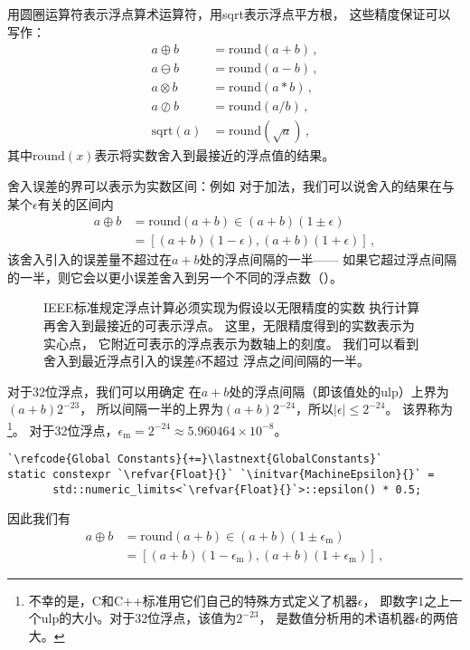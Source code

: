 用圆圈运算符表示浮点算术运算符，用sqrt表示浮点平方根，
这些精度保证可以写作：
\begin{align}
    a\oplus b        & =\mathrm{round}(a+b)\, ,\nonumber      \\
    a\ominus b       & =\mathrm{round}(a-b)\, ,\nonumber      \\
    a\otimes b       & =\mathrm{round}(a*b)\, ,\label{eq:3.7} \\
    a\oslash b       & =\mathrm{round}(a/b)\, ,\nonumber      \\
    \mathrm{sqrt}(a) & =\mathrm{round}(\sqrt{a})\, ,\nonumber
\end{align}
其中$\mathrm{round}(x)$表示将实数舍入到最接近的浮点值的结果。

舍入误差的界可以表示为实数区间：例如
对于加法，我们可以说舍入的结果在与某个$\epsilon$有关的区间内
\begin{align}
    a\oplus b & =\mathrm{round}(a+b)\in(a+b)(1\pm\epsilon)\nonumber \\
              & =[(a+b)(1-\epsilon),(a+b)(1+\epsilon)]\, ,
    \label{eq:3.8}
\end{align}
该舍入引入的误差量不超过在$a+b$处的浮点间隔的一半——
如果它超过浮点间隔的一半，则它会以更小误差舍入到另一个不同的浮点数（）。
\begin{figure}[htbp]
    \centering
    \caption{IEEE标准规定浮点计算必须实现为假设以无限精度的实数
        执行计算再舍入到最接近的可表示浮点。
        这里，无限精度得到的实数表示为实心点，
        它附近可表示的浮点表示为数轴上的刻度。
        我们可以看到舍入到最近浮点引入的误差$\delta$不超过
        浮点之间间隔的一半。}
    \label{fig:3.41}
\end{figure}

对于32位浮点，我们可以用确定
在$a+b$处的浮点间隔（即该值处的ulp）上界为$(a+b)2^{-23}$，
所以间隔一半的上界为$(a+b)2^{-24}$，所以$|\epsilon|\le2^{-24}$。
该界称为
\footnote{不幸的是，C和C++标准用它们自己的特殊方式定义了机器$\epsilon$，
    即数字1之上一个ulp的大小。对于32位浮点，该值为$2^{-23}$，
    是数值分析用的术语机器$\epsilon$的两倍大。}。
对于32位浮点，$\epsilon_{\mathrm{m}}=2^{-24}\approx5.960464\times10^{-8}$。
\begin{lstlisting}
`\refcode{Global Constants}{+=}\lastnext{GlobalConstants}`
static constexpr `\refvar{Float}{}` `\initvar{MachineEpsilon}{}` =
       std::numeric_limits<`\refvar{Float}{}`>::epsilon() * 0.5;
\end{lstlisting}
因此我们有
\begin{align*}
    a\oplus b & =\mathrm{round}(a+b)\in(a+b)(1\pm\epsilon_{\mathrm{m}})\nonumber     \\
              & =[(a+b)(1-\epsilon_{\mathrm{m}}),(a+b)(1+\epsilon_{\mathrm{m}})]\, ,
\end{align*}

